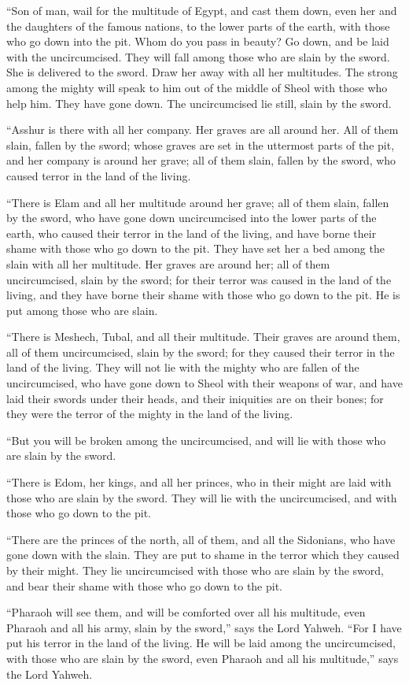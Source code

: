 {“Son of man, wail for the multitude of Egypt, and cast them down, even her and the daughters of the famous nations, to the lower parts of the earth, with those who go down into the pit.
Whom do you pass in beauty? Go down, and be laid with the uncircumcised.
They will fall among those who are slain by the sword. She is delivered to the sword. Draw her away with all her multitudes.
The strong among the mighty will speak to him out of the middle of Sheol
 with those who help him. They have gone down. The uncircumcised lie still, slain by the sword.
\par }{\PP {}“Asshur is there with all her company. Her graves are all around her. All of them slain, fallen by the sword;
whose graves are set in the uttermost parts of the pit, and her company is around her grave; all of them slain, fallen by the sword, who caused terror in the land of the living.
\par }{\PP {}“There is Elam and all her multitude around her grave; all of them slain, fallen by the sword, who have gone down uncircumcised into the lower parts of the earth, who caused their terror in the land of the living, and have borne their shame with those who go down to the pit.
They have set her a bed among the slain with all her multitude. Her graves are around her; all of them uncircumcised, slain by the sword; for their terror was caused in the land of the living, and they have borne their shame with those who go down to the pit. He is put among those who are slain.
\par }{\PP {}“There is Meshech, Tubal, and all their multitude. Their graves are around them, all of them uncircumcised, slain by the sword; for they caused their terror in the land of the living.
They will not lie with the mighty who are fallen of the uncircumcised, who have gone down to Sheol with their weapons of war, and have laid their swords under their heads, and their iniquities are on their bones; for they were the terror of the mighty in the land of the living.
\par }{\PP {}“But you will be broken among the uncircumcised, and will lie with those who are slain by the sword.
\par }{\PP {}“There is Edom, her kings, and all her princes, who in their might are laid with those who are slain by the sword. They will lie with the uncircumcised, and with those who go down to the pit.
\par }{\PP {}“There are the princes of the north, all of them, and all the Sidonians, who have gone down with the slain. They are put to shame in the terror which they caused by their might. They lie uncircumcised with those who are slain by the sword, and bear their shame with those who go down to the pit.
\par }{\PP {}“Pharaoh will see them, and will be comforted over all his multitude, even Pharaoh and all his army, slain by the sword,” says the Lord Yahweh.
“For I have put his terror in the land of the living. He will be laid among the uncircumcised, with those who are slain by the sword, even Pharaoh and all his multitude,” says the Lord Yahweh.

}
